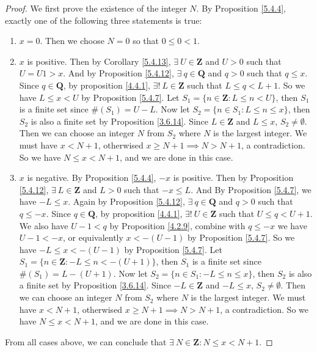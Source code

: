 \begin{proof}
    We first prove the existence of the integer \(N\).
    By Proposition \ref{5.4.4}, exactly one of the following three statements is true:
    \begin{enumerate}
        \item \(x = 0\).
              Then we choose \(N = 0\) so that \(0 \leq 0 < 1\).
        \item \(x\) is positive.
              Then by Corollary \ref{5.4.13}, \(\exists\ U \in \mathbf{Z}\) and \(U > 0\) such that \(U = U1 > x\).
              And by Proposition \ref{5.4.12}, \(\exists\ q \in \mathbf{Q}\) and \(q > 0\) such that \(q \leq x\).
              Since \(q \in \mathbf{Q}\), by proposition \ref{4.4.1}, \(\exists!\ L \in \mathbf{Z}\) such that \(L \leq q < L + 1\).
              So we have \(L \leq x < U\) by Proposition \ref{5.4.7}.
              Let \(S_1 = \{n \in \mathbf{Z} : L \leq n < U\}\), then \(S_1\) is a finite set since \(\#(S_1) = U - L\).
              Now let \(S_2 = \{n \in S_1 : L \leq n \leq x\}\), then \(S_2\) is also a finite set by Proposition \ref{3.6.14}.
              Since \(L \in \mathbf{Z}\) and \(L \leq x\), \(S_2 \neq \emptyset\).
              Then we can choose an integer \(N\) from \(S_2\) where \(N\) is the largest integer.
              We must have \(x < N + 1\), otherwised \(x \geq N + 1 \implies N > N + 1\), a contradiction.
              So we have \(N \leq x < N + 1\), and we are done in this case.
        \item \(x\) is negative.
              By Proposition \ref{5.4.4}, \(-x\) is positive.
              Then by Proposition \ref{5.4.12}, \(\exists\ L \in \mathbf{Z}\) and \(L > 0\) such that \(-x \leq L\).
              And By Proposition \ref{5.4.7}, we have \(-L \leq x\).
              Again by Proposition \ref{5.4.12}, \(\exists\ q \in \mathbf{Q}\) and \(q > 0\) such that \(q \leq -x\).
              Since \(q \in \mathbf{Q}\), by proposition \ref{4.4.1}, \(\exists!\ U \in \mathbf{Z}\) such that \(U \leq q < U + 1\).
              We also have \(U - 1 < q\) by Proposition \ref{4.2.9}, combine with \(q \leq -x\) we have \(U - 1 < -x\), or equivalently \(x < -(U - 1)\) by Proposition \ref{5.4.7}.
              So we have \(-L \leq x < -(U - 1)\) by Proposition \ref{5.4.7}.
              Let \(S_1 = \{n \in \mathbf{Z} : -L \leq n < -(U + 1)\}\), then \(S_1\) is a finite set since \(\#(S_1) = L - (U + 1)\).
              Now let \(S_2 = \{n \in S_1 : -L \leq n \leq x\}\), then \(S_2\) is also a finite set by Proposition \ref{3.6.14}.
              Since \(-L \in \mathbf{Z}\) and \(-L \leq x\), \(S_2 \neq \emptyset\).
              Then we can choose an integer \(N\) from \(S_2\) where \(N\) is the largest integer.
              We must have \(x < N + 1\), otherwised \(x \geq N + 1 \implies N > N + 1\), a contradiction.
              So we have \(N \leq x < N + 1\), and we are done in this case.
    \end{enumerate}
    From all cases above, we can conclude that \(\exists\ N \in \mathbf{Z} : N \leq x < N + 1\).


\end{proof}

